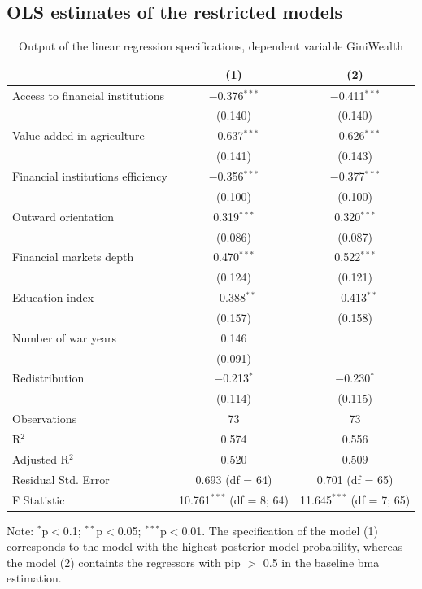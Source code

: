 \documentclass[a4paper,11pt]{article}
\begin{document}
\subsection*{OLS estimates of the restricted models}
\begin{table}[!htbp] 
\centering 
\caption{Output of the linear regression specifications, dependent variable GiniWealth} 
\label{res:ols}
\begin{threeparttable}
\begin{tabular}{@{\extracolsep{5pt}}lcc} 
\toprule
  & (1) & (2) \\ 
\midrule
 Access to financial institutions & $-$0.376$^{***}$ & $-$0.411$^{***}$ \\ 
  & (0.140) & (0.140) \\ 
 Value added in agriculture & $-$0.637$^{***}$ & $-$0.626$^{***}$ \\ 
  & (0.141) & (0.143) \\ 
 Financial institutions efficiency & $-$0.356$^{***}$ & $-$0.377$^{***}$ \\ 
  & (0.100) & (0.100) \\ 
 Outward orientation & 0.319$^{***}$ & 0.320$^{***}$ \\ 
  & (0.086) & (0.087) \\ 
 Financial markets depth & 0.470$^{***}$ & 0.522$^{***}$ \\ 
  & (0.124) & (0.121) \\ 
 Education index & $-$0.388$^{**}$ & $-$0.413$^{**}$ \\ 
  & (0.157) & (0.158) \\ 
 Number of war years & 0.146 &  \\ 
  & (0.091) &  \\ 
 Redistribution & $-$0.213$^{*}$ & $-$0.230$^{*}$ \\ 
  & (0.114) & (0.115) \\ 
\midrule 
Observations & 73 & 73 \\ 
R$^{2}$ & 0.574 & 0.556 \\ 
Adjusted R$^{2}$ & 0.520 & 0.509 \\ 
Residual Std. Error & 0.693 (df = 64) & 0.701 (df = 65) \\ 
F Statistic & 10.761$^{***}$ (df = 8; 64) & 11.645$^{***}$ (df = 7; 65) 
\end{tabular}
\begin{tablenotes}
\footnotesize
\item Note: {$^{*}$p$<$0.1; $^{**}$p$<$0.05; $^{***}$p$<$0.01.} The specification of the model (1) corresponds to the model with the highest posterior model probability, whereas the model (2) containts the regressors with \ac{pip} $>$ 0.5 in the baseline \ac{bma} estimation.
\end{tablenotes}
\end{threeparttable}
\end{table}
\clearpage
\end{document}

